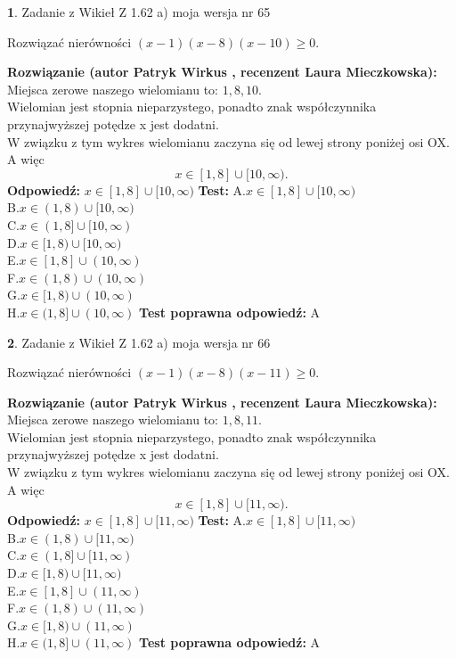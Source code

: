 \documentclass[12pt, a4paper]{article}
\theoremstyle{definition} %
\newtheorem{zad}{}
\newcommand{\zadStart}[1]{\begin{zad}#1\newline}
\newcommand{\zadStop}{\end{zad}}
\newcommand{\rozwStart}[2]{\noindent \textbf{Rozwiązanie (autor #1 , recenzent #2): }\newline}
\newcommand{\rozwStop}{\newline}
\newcommand{\odpStart}{\noindent \textbf{Odpowiedź:}\newline}
\newcommand{\odpStop}{\newline}
\newcommand{\testStart}{\noindent \textbf{Test:}\newline}
\newcommand{\testStop}{\newline}
\newcommand{\kluczStart}{\noindent \textbf{Test poprawna odpowiedź:}\newline}
\newcommand{\kluczStop}{\newline}
\begin{document}
\zadStart{Zadanie z Wikieł Z 1.62 a) moja wersja nr 65}

Rozwiązać nierówności $(x-1)(x-8)(x-10)\ge0$.
\zadStop
\rozwStart{Patryk Wirkus}{Laura Mieczkowska}
Miejsca zerowe naszego wielomianu to: $1, 8, 10$.\\
Wielomian jest stopnia nieparzystego, ponadto znak współczynnika przy\linebreak najwyższej potędze x jest dodatni.\\ W związku z tym wykres wielomianu zaczyna się od lewej strony poniżej osi OX. A więc $$x \in [1,8] \cup [10,\infty).$$
\rozwStop
\odpStart
$x \in [1,8] \cup [10,\infty)$
\odpStop
\testStart
A.$x \in [1,8] \cup [10,\infty)$\\
B.$x \in (1,8) \cup [10,\infty)$\\
C.$x \in (1,8] \cup [10,\infty)$\\
D.$x \in [1,8) \cup [10,\infty)$\\
E.$x \in [1,8] \cup (10,\infty)$\\
F.$x \in (1,8) \cup (10,\infty)$\\
G.$x \in [1,8) \cup (10,\infty)$\\
H.$x \in (1,8] \cup (10,\infty)$
\testStop
\kluczStart
A
\kluczStop



\zadStart{Zadanie z Wikieł Z 1.62 a) moja wersja nr 66}

Rozwiązać nierówności $(x-1)(x-8)(x-11)\ge0$.
\zadStop
\rozwStart{Patryk Wirkus}{Laura Mieczkowska}
Miejsca zerowe naszego wielomianu to: $1, 8, 11$.\\
Wielomian jest stopnia nieparzystego, ponadto znak współczynnika przy\linebreak najwyższej potędze x jest dodatni.\\ W związku z tym wykres wielomianu zaczyna się od lewej strony poniżej osi OX. A więc $$x \in [1,8] \cup [11,\infty).$$
\rozwStop
\odpStart
$x \in [1,8] \cup [11,\infty)$
\odpStop
\testStart
A.$x \in [1,8] \cup [11,\infty)$\\
B.$x \in (1,8) \cup [11,\infty)$\\
C.$x \in (1,8] \cup [11,\infty)$\\
D.$x \in [1,8) \cup [11,\infty)$\\
E.$x \in [1,8] \cup (11,\infty)$\\
F.$x \in (1,8) \cup (11,\infty)$\\
G.$x \in [1,8) \cup (11,\infty)$\\
H.$x \in (1,8] \cup (11,\infty)$
\testStop
\kluczStart
A
\kluczStop
\end{document}
